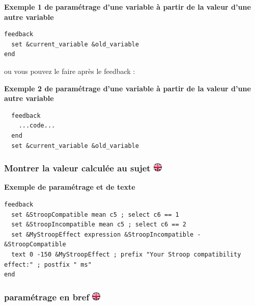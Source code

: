 \documentclass[
]{book}
\begin{document}
\textbf{Exemple 1 de paramétrage d'une variable à partir de la valeur d'une autre variable}

\begin{verbatim}
feedback
  set &current_variable &old_variable
end
\end{verbatim}

ou vous pouvez le faire après le feedback :

\textbf{Exemple 2 de paramétrage d'une variable à partir de la valeur d'une autre variable}

\begin{verbatim}
  feedback
    ...code...
  end
  set &current_variable &old_variable
\end{verbatim}

\hypertarget{montrer-la-valeur-calculuxe9e-au-sujet}{%
\subsubsection[Montrer la valeur calculée au sujet ]{\texorpdfstring{Montrer la valeur calculée au sujet \href{https://www.psytoolkit.org/doc3.1.0/feedback.html\#_show_calculated_values_to_participant}{\protect\includegraphics{img/ukflag.png}}}{Montrer la valeur calculée au sujet }}\label{montrer-la-valeur-calculuxe9e-au-sujet}}

\textbf{Exemple de paramétrage et de texte}

\begin{verbatim}
feedback
  set &StroopCompatible mean c5 ; select c6 == 1
  set &StroopIncompatible mean c5 ; select c6 == 2
  set &MyStroopEffect expression &StroopIncompatible - &StroopCompatible
  text 0 -150 &MyStroopEffect ; prefix "Your Stroop compatibility effect:" ; postfix " ms"
end
\end{verbatim}

\hypertarget{paramuxe9trage-en-bref}{%
\subsubsection[paramétrage en bref ]{\texorpdfstring{paramétrage en bref \href{https://www.psytoolkit.org/doc3.1.0/feedback.html\#_set_in_summary}{\protect\includegraphics{img/ukflag.png}}}{paramétrage en bref }}\label{paramuxe9trage-en-bref}}
\end{document}
